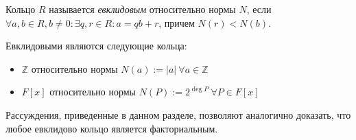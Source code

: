 \begin{definition}
	Кольцо $R$ называется \textit{евклидовым} относительно нормы $N$, если $\forall a, b \in R, b \ne 0: \exists q, r \in R: a = qb + r$, причем $N(r) < N(b)$.
\end{definition}
	
\begin{example}
	Евклидовыми являются следующие кольца:
	\begin{itemize}
		\item $\mathbb{Z}$ относительно нормы $N(a) := |a|~\forall a \in \mathbb{Z}$
		\item $F[x]$ относительно нормы $N(P) := 2^{\deg{P}}~\forall P \in F[x]$
	\end{itemize}
\end{example}
	
\begin{note}
	Рассуждения, приведенные в данном разделе, позволяют аналогично доказать, что любое евклидово кольцо является факториальным.
\end{note}